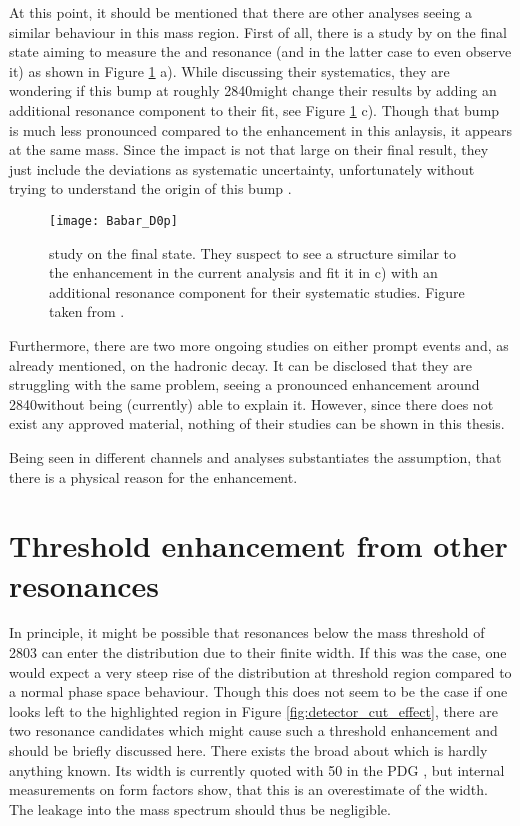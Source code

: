 At this point, it should be mentioned that there are other analyses seeing a similar behaviour in this \Dz\proton mass region.
First of all, there is a study by \babar on the \Dz\proton final state aiming to measure the \LcResI and \LcResII resonance (and in the latter case to even observe it) as shown in Figure \ref{fig:Babar_D0p} a).
While discussing their systematics, they are wondering if this bump at roughly 2840\mev might change their results by adding an additional resonance component to their fit, see Figure \ref{fig:Babar_D0p} c).
Though that bump is much less pronounced compared to the enhancement in this anlaysis, it appears at the same mass.
Since the impact is not that large on their final result, they just include the deviations as systematic uncertainty, unfortunately without trying to understand the origin of this bump \cite{BaBar_D0p}.
\begin{figure}[tb]
	\centering
	\texttt{[image: Babar\_D0p]}
	\caption{\babar study on the \Dz\proton final state. They suspect to see a structure similar to the enhancement in the current analysis and fit it in c) with an additional resonance component for their systematic studies. Figure taken from \cite{BaBar_D0p}.}
	\label{fig:Babar_D0p}
\end{figure}

Furthermore, there are two more ongoing \lhcb studies on either prompt \Dz\proton events and, as already mentioned, on the hadronic \decay{\Lb}{\Dz\proton\pim} decay.
It can be disclosed that they are struggling with the same problem, seeing a pronounced enhancement around 2840\mev without being (currently) able to explain it.
However, since there does not exist any approved material, nothing of their studies can be shown in this thesis.

Being seen in different channels and analyses substantiates the assumption, that there is a physical reason for the enhancement.

\section{Threshold enhancement from other resonances}
In principle, it might be possible that resonances below the \Dz\proton mass threshold of 2803 \mev can enter the distribution due to their finite width.
If this was the case, one would expect a very steep rise of the distribution at threshold region compared to a normal phase space behaviour.
Though this does not seem to be the case if one looks left to the highlighted region in Figure \ref{fig:detector_cut_effect}, there are two resonance candidates which might cause such a threshold enhancement and should be briefly discussed here.
There exists the broad  about which is hardly anything known.
Its width is currently quoted with 50 \mev in the PDG \cite{PDG}, but internal \lhcb measurements on \Lb form factors show, that this is an overestimate of the  width.
The leakage into the \Dz\proton mass spectrum should thus be negligible.

